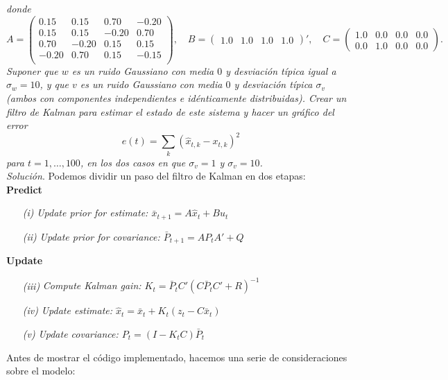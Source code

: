 \documentclass[11pt,a4paper]{article}
\begin{document}
\textit{donde}
\[
  A =
  \begin{pmatrix}
     0.15 &  0.15 &  0.70 & -0.20 \\
     0.15 &  0.15 & -0.20 &  0.70 \\
     0.70 & -0.20 &  0.15 &  0.15 \\
    -0.20 &  0.70 &  0.15 & -0.15 \\
  \end{pmatrix},
  \quad
  B =
  \begin{pmatrix}
    1.0 & 1.0 & 1.0 & 1.0
  \end{pmatrix}',
  \quad
  C =
  \begin{pmatrix}
    1.0 & 0.0 & 0.0 & 0.0 \\
    0.0 & 1.0 & 0.0 & 0.0
  \end{pmatrix}.
\]
\textit{Suponer que $w$ es un ruido Gaussiano con media $0$ y desviación típica igual a $\sigma_w=10$, y que $v$ es un ruido Gaussiano con media $0$ y desviación típica $\sigma_v$ (ambos con componentes independientes e idénticamente distribuidas). Crear un filtro de Kalman para estimar el estado de este sistema y hacer un gráfico del error
\[
e(t)=\sum_{k}(\hat x_{t,k} - x_{t,k})^2
\]
para $t=1,\dots,100$, en los dos casos en que $\sigma_v=1$ y $\sigma_v=10$.}\\

\textit{Solución}. Podemos dividir un paso del filtro de Kalman en dos etapas:\\

\textbf{Predict}
\begin{enumerate}
  \item[\textit{(i)}] \textit{Update prior for estimate: $\bar x_{t+1} = A\hat x_t + Bu_t$}
  \item[\textit{(ii)}] \textit{Update prior for covariance: $\bar P_{t+1}=AP_tA' + Q$}
\end{enumerate}

\textbf{Update}
\begin{enumerate}
  \item[\textit{(iii)}] \textit{Compute Kalman gain: $K_t = \bar P_t C'(C\bar P_tC' + R)^{-1}$}
  \item[\textit{(iv)}] \textit{Update estimate: $\hat x_{t} = \bar x_t + K_t(z_t - C\bar x_t)$}
  \item[\textit{(v)}] \textit{Update covariance: $P_t=(I -K_tC)\bar P_t$}
\end{enumerate}

Antes de mostrar el código implementado, hacemos una serie de consideraciones sobre el modelo:
\end{document}
